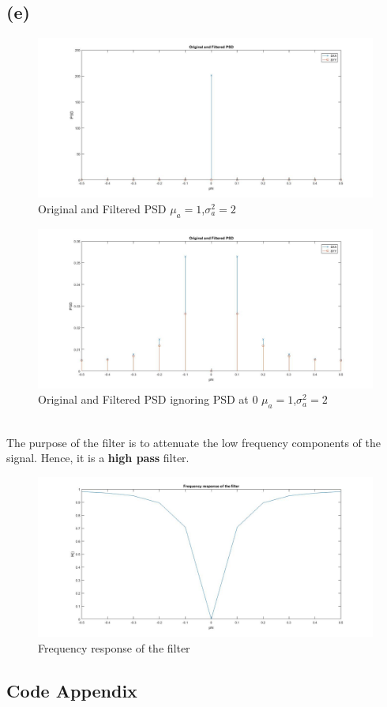 \documentclass[a4paper,11pt]{article}
\begin{document}
\subsection*{(e)}
\begin{figure}[h]
  \hspace*{-5cm}
   \includegraphics[scale=0.45]{q2_e}
   \caption{Original and Filtered PSD  $\mu_a = 1$,$\sigma_a^2 = 2$}\label{fig:q3}
\end{figure}
\clearpage
\newpage
\begin{figure}[h]
  \hspace*{-5cm}
   \includegraphics[scale=0.45]{q2_e_2}
   \caption{Original and Filtered PSD ignoring PSD at 0 $\mu_a = 1$,$\sigma_a^2 = 2$}\label{fig:q3}
\end{figure}
\quad \\
The  purpose of the filter is to attenuate the low frequency components of the signal. Hence, it is a \textbf{high pass} filter.
\begin{figure}[h]
  \hspace*{-5cm}
   \includegraphics[scale=0.45]{q2_e_3}
   \caption{Frequency response of the filter}\label{fig:q3}
\end{figure}
\newpage
\begin{appendix}
\section*{Code Appendix}
 
\end{appendix}
\end{document}
